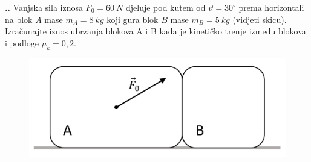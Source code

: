 

\noindent 
\textbf{
\thecjelina.\thezadatak.}
Vanjska sila iznosa $F_0=60\ N$ djeluje pod kutem od $\vartheta = 30^\circ$ prema horizontali na blok $A$ mase $m_A=8 \ kg$ koji gura blok 
$B$ mase $m_B=5\ kg$ (vidjeti skicu). Izračunajte iznos ubrzanja blokova A i B kada je kinetičko trenje između blokova i podloge $\mu _k=0,2$.

\begin{figure}[h]%
  \begin{center}
    \includegraphics[scale=0.15]{03_Dinamika_materijalne_tocke/zadatak_D318.png}
  \end{center}
\end{figure}

